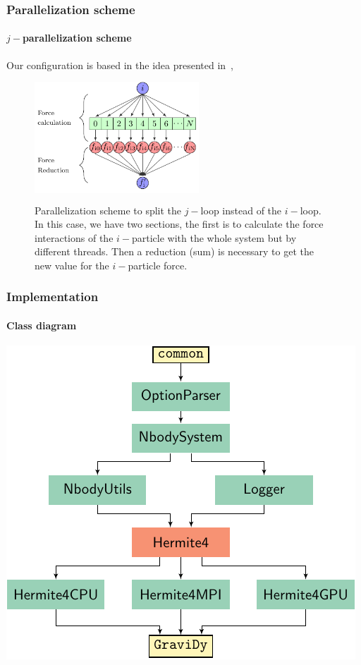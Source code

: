 \begin{frame}
    \frametitle{Parallelization scheme}
    \framesubtitle{$j-$parallelization scheme}

    Our configuration is based in the idea presented in~\cite{NitadoriAarseth2012},

    \begin{center}
    \begin{figure}[H]
        \centering
    \colorbox{white}{
        \includegraphics[width=0.55\textwidth]{img/force_split_reduction.pdf}
    }
        \caption{Parallelization scheme to split the $j-$loop instead of the $i-$loop.
                 In this case, we have two sections, the first is to calculate
                 the force interactions of the $i-$particle with the whole
                 system but by different threads. Then a reduction (sum) is necessary
                 to get the new value for the $i-$particle force.}
        \label{fig:force_split_reduction}
    \end{figure}
    \end{center}

\end{frame}

\begin{frame}
    \frametitle{Implementation}
    \framesubtitle{Class diagram}
    \begin{center}
        \includegraphics[height=0.8\textheight]{img/files_structure.pdf}
    \end{center}
\end{frame}

